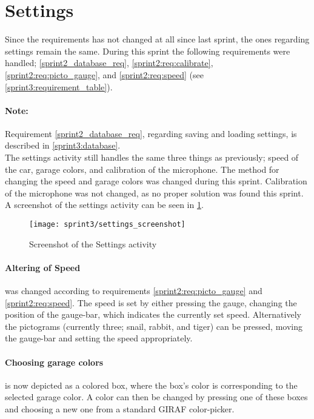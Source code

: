 \section{Settings}\label{sprint3:settings}

Since the requirements has not changed at all since last sprint, the ones regarding settings remain the same.
During this sprint the following requirements were handled; \ref{sprint2_database_req}, \ref{sprint2:req:calibrate}, \ref{sprint2:req:picto_gauge}, and \ref{sprint2:req:speed} (see \cref{sprint3:requirement_table}).

\paragraph{Note:} Requirement \ref{sprint2_database_req}, regarding saving and loading settings, is described in \ref{sprint3:database}.\\

\noindent
The settings activity still handles the same three things as previously; speed of the car, garage colors, and calibration of the microphone.
The method for changing the speed and garage colors was changed during this sprint.
Calibration of the microphone was not changed, as no proper solution was found this sprint.
A screenshot of the settings activity can be seen in \cref{sprint3:settings:screenshot}.

\begin{figure}
\texttt{[image: sprint3/settings\_screenshot]}
\caption{Screenshot of the Settings activity}
\label{sprint3:settings:screenshot}
\end{figure}

\paragraph{Altering of Speed} was changed according to requirements \ref{sprint2:req:picto_gauge} and \ref{sprint2:req:speed}.
The speed is set by either pressing the gauge, changing the position of the gauge-bar, which indicates the currently set speed.
Alternatively the pictograms (currently three; snail, rabbit, and tiger) can be pressed, moving the gauge-bar and setting the speed appropriately.

\paragraph{Choosing garage colors} is now depicted as a colored box, where the box's color is corresponding to the selected garage color.
A color can then be changed by pressing one of these boxes and choosing a new one from a standard GIRAF color-picker.